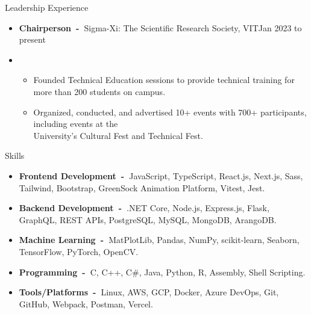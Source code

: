 \documentclass{resume}
\begin{document}
\vspace{-0.5\baselineskip}


\begin{rSection}{Leadership Experience}
      \begin{itemize}[label=\null, leftmargin=*, parsep=0.5em]
            \item {
                  \textbf{Chairperson~-~}Sigma-Xi: The Scientific Research Society, VIT\hfill Jan 2023 to present
                  } \\
            \item {
                  \vspace{-1.2\baselineskip}
                  \begin{itemize}[label=$\bullet$]
                        \vspace{-\parskip}
                        \vspace{-\parsep}
                        \item {
                              Founded Technical Education sessions to provide technical training for more than 200 students on campus.
                              }
                        \item {
                              Organized, conducted, and advertised 10+ events with 700+ participants, including events at the \\
                              University's Cultural Fest and Technical Fest.
                              }
                  \end{itemize}
                  }
      \end{itemize}


\end{rSection}


\vspace{-0.5\baselineskip}


\begin{rSection}{Skills}
      \begin{itemize}[label=\null, leftmargin=*, parsep=0.5em]
            \item {
                  \textbf{Frontend Development~-~}JavaScript, TypeScript, React.js, Next.js, Sass, Tailwind, Bootstrap, GreenSock
                  Animation Platform, Vitest, Jest.
                  }
            \item {
                  \textbf{Backend Development~-~}.NET Core, Node.js, Express.js, Flask, GraphQL, REST APIs, PostgreSQL, MySQL,
                  MongoDB, ArangoDB.\@
                  }
            \item {
                  \textbf{Machine Learning~-~}MatPlotLib, Pandas, NumPy, scikit-learn, Seaborn, TensorFlow, PyTorch, OpenCV.\@
                  }
            \item {
                  \textbf{Programming~-~}C, C++, C\#, Java, Python, R, Assembly, Shell Scripting.
                  }
            \item {
                  \textbf{Tools/Platforms~-~}Linux, AWS, GCP, Docker, Azure DevOps, Git, GitHub, Webpack, Postman, Vercel.
                  }
      \end{itemize}
\end{rSection}

\end{document}
